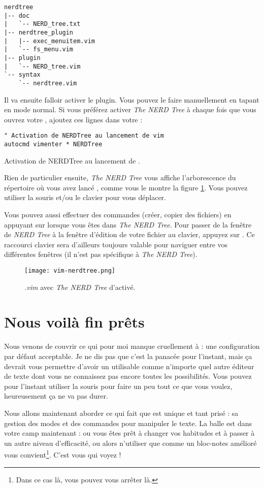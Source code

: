 \begin{verbatim}
nerdtree
|-- doc
|   `-- NERD_tree.txt
|-- nerdtree_plugin
|   |-- exec_menuitem.vim
|   `-- fs_menu.vim
|-- plugin
|   `-- NERD_tree.vim
`-- syntax
    `-- nerdtree.vim
\end{verbatim}

Il va ensuite falloir activer le plugin. Vous pouvez le faire manuellement en tapant  en mode normal. Si vous préférez activer \emph{The NERD Tree} à chaque fois que vous ouvrez votre \vim, ajoutez ces lignes dans votre \vimrc:

\begin{listing}[H]
\begin{verbatim}
" Activation de NERDTree au lancement de vim
autocmd vimenter * NERDTree
\end{verbatim}
\caption{Activation de NERDTree au lancement de \vim.}
\label{code:pathogen}
\end{listing}

Rien de particulier ensuite, \emph{The NERD Tree} vous affiche l'arborescence du répertoire où vous avez lancé \vim, comme vous le montre la figure \ref{fig:vim-nerdtree}. Vous pouvez utiliser la souris et/ou le clavier pour vous déplacer. 

Vous pouvez aussi effectuer des commandes (créer, copier des fichiers) en appuyant sur \ttm lorsque vous êtes dans \emph{The NERD Tree}. Pour passer de la fenêtre de \emph{NERD Tree} à la fenêtre d'édition de votre fichier au clavier, appuyez sur . Ce raccourci clavier sera d'ailleurs toujours valable pour naviguer entre vos différentes fenêtres \vim (il n'est pas spécifique à \emph{The NERD Tree}).

\begin{figure}%
  \texttt{[image: vim-nerdtree.png]}
  \caption{\emph{.vim} avec \emph{The NERD Tree} d'activé.}
  \label{fig:vim-nerdtree}
\end{figure}

\section{Nous voilà fin prêts}

Nous venons de couvrir ce qui pour moi manque cruellement à \vim : une configuration par défaut acceptable. Je ne dis pas que c'est la panacée pour l'instant, mais ça devrait vous permettre d'avoir un \vim utilisable comme n'importe quel autre éditeur de texte dont vous ne connaissez pas encore toutes les possibilités. Vous pouvez pour l'instant utiliser la souris pour faire un peu tout ce que vous voulez, heureusement ça ne va pas durer.

Nous allons maintenant aborder ce qui fait que \vim est unique et tant prisé : sa gestion des modes et des commandes pour manipuler le texte. La balle est dans votre camp maintenant : ou vous êtes prêt à changer vos habitudes et à passer à un autre niveau d'efficacité, ou alors n'utiliser \vim que comme un bloc-notes amélioré vous convient\footnote{Dans ce cas là, vous pouvez vous arrêter là.}. C'est vous qui voyez !
